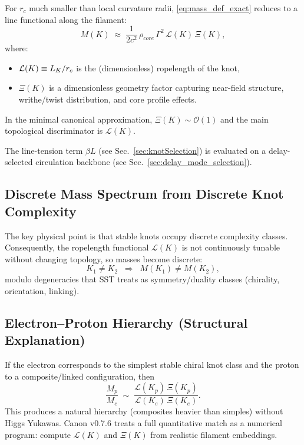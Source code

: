\documentclass[10pt]{article}
\newcommand{\rhocore}{\rho_{core}}
\begin{document}
        For $r_c$ much smaller than local curvature radii, \eqref{eq:mass_def_exact}
        reduces to a line functional along the filament:
        \begin{equation}
            M(K)
            \;\approx\;
            \frac{1}{2c^2}\,
            \rhocore\,\Gamma^2\,\mathcal{L}(K)\,\Xi(K),
            \label{eq:mass_slender}
        \end{equation}
        where:
        \begin{itemize}
            \item $\mathcal{L}(K)\equiv L_K/r_c$ is the (dimensionless) ropelength of the knot,
            \item $\Xi(K)$ is a dimensionless geometry factor capturing near-field structure,
            writhe/twist distribution, and core profile effects.
        \end{itemize}
        In the minimal canonical approximation, $\Xi(K)\sim \mathcal{O}(1)$ and the main
        topological discriminator is $\mathcal{L}(K)$.
        
        The line-tension term $\beta L$ (see Sec.~\ref{sec:knotSelection}) is evaluated on a delay-selected circulation backbone (see Sec.~\ref{sec:delay_mode_selection}).

    \subsection{Discrete Mass Spectrum from Discrete Knot Complexity}

        The key physical point is that stable knots occupy discrete complexity classes.
        Consequently, the ropelength functional $\mathcal{L}(K)$ is not continuously tunable
        without changing topology, so masses become discrete:
        \begin{equation}
            K_1\neq K_2 \;\;\Rightarrow\;\; M(K_1)\neq M(K_2),
        \end{equation}
        modulo degeneracies that SST treats as symmetry/duality classes (chirality,
        orientation, linking).

    \subsection{Electron--Proton Hierarchy (Structural Explanation)}

        If the electron corresponds to the simplest stable chiral knot class and the proton
        to a composite/linked configuration, then
        \begin{equation}
            \frac{M_p}{M_e}\;\sim\;\frac{\mathcal{L}(K_p)\,\Xi(K_p)}{\mathcal{L}(K_e)\,\Xi(K_e)}.
        \end{equation}
        This produces a natural hierarchy (composites heavier than simples) without Higgs
        Yukawas. Canon v0.7.6 treats a full quantitative match as a numerical program:
        compute $\mathcal{L}(K)$ and $\Xi(K)$ from realistic filament embeddings.
\end{document}
